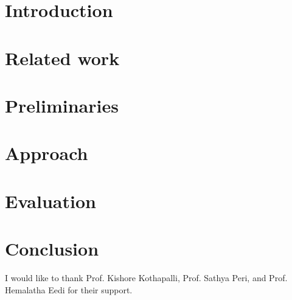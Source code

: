 \documentclass[sigconf,nonacm]{acmart}
\newcommand{\ignore}[1]{}
\begin{document}






\maketitle

\section{Introduction}
\label{sec:introduction}


\section{Related work}
\label{sec:related}


\section{Preliminaries}
\label{sec:preliminaries}


\section{Approach}
\label{sec:approach}


\section{Evaluation}
\label{sec:evaluation}


\section{Conclusion}
\label{sec:conclusion}


\begin{acks}
I would like to thank Prof. Kishore Kothapalli, Prof. Sathya Peri, and Prof. Hemalatha Eedi for their support.\ignore{Note that Britannia Industries Ltd., the owner of the 50-50 biscuit brand, did not sponsor our work.}
\end{acks}




\clearpage
\appendix

\end{document}
